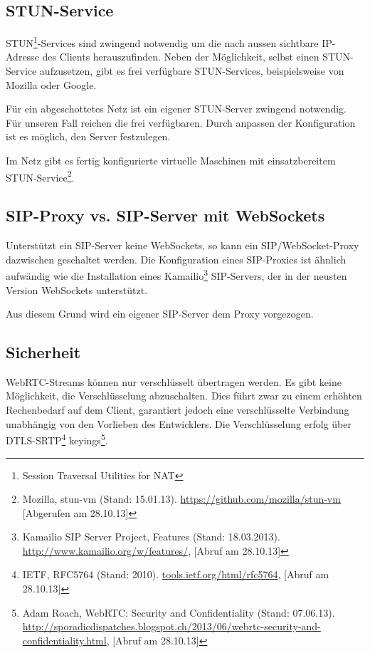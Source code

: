 	\subsection{STUN-Service}
		STUN\footnote{Session Traversal Utilities for NAT}-Services sind zwingend
		notwendig um die nach aussen sichtbare IP-Adresse des Clients herauszufinden.
		Neben der Möglichkeit, selbst einen STUN-Service aufzusetzen, gibt es frei
		verfügbare STUN-Services, beispielsweise von Mozilla oder Google.

		Für ein abgeschottetes Netz ist ein eigener STUN-Server zwingend notwendig.
		Für unseren Fall reichen die frei verfügbaren. Durch anpassen der
		Konfiguration ist es möglich, den Server festzulegen.

		Im Netz gibt es fertig konfigurierte virtuelle Maschinen mit einsatzbereitem
		STUN-Service\footnote{Mozilla, stun-vm (Stand: 15.01.13). \hyperlink{https://github.com/mozilla/stun-vm}{https://github.com/mozilla/stun-vm} [Abgerufen am 28.10.13]}.

	\subsection{SIP-Proxy vs. SIP-Server mit WebSockets}
		Unterstützt ein SIP-Server keine WebSockets, so kann ein SIP/WebSocket-Proxy
		dazwischen geschaltet werden. Die Konfiguration eines SIP-Proxies ist ähnlich
		aufwändig wie die Installation eines Kamailio\footnote{Kamailio SIP Server
		Project, Features (Stand: 18.03.2013). \hyperlink{http://www.kamailio.org/w/features/}{http://www.kamailio.org/w/features/}, [Abruf am 28.10.13]} SIP-Servers, der in der neusten Version WebSockets unterstützt.

		Aus diesem Grund wird ein eigener SIP-Server dem Proxy vorgezogen.

	\subsection{Sicherheit}
		WebRTC-Streams können nur verschlüsselt übertragen werden. Es gibt keine
		Möglichkeit, die Verschlüsselung abzuschalten. Dies führt zwar zu einem
		erhöhten Rechenbedarf auf dem Client, garantiert jedoch eine verschlüsselte
		Verbindung unabhängig von den Vorlieben des Entwicklers.
		Die Verschlüsselung erfolg über DTLS-SRTP\footnote{IETF, RFC5764 (Stand: 2010). \hyperlink{http://tools.ietf.org/html/rfc5764}{tools.ietf.org/html/rfc5764}, [Abruf am 28.10.13]} keyings\footnote{Adam Roach, WebRTC: Security and Confidentiality (Stand: 07.06.13). \hyperlink{http://sporadicdispatches.blogspot.ch/2013/06/webrtc-security-and-confidentiality.html}{http://sporadicdispatches.blogspot.ch/2013/06/webrtc-security-and-confidentiality.html}, [Abruf am 28.10.13]}. 
		
